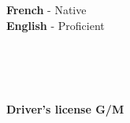 \documentclass[8pt]{developercv} %
\begin{document}

\begin{minipage}[t]{0.3\textwidth}
	\vspace{-\baselineskip} %

	
	\textbf{French} - Native\\
	\textbf{English} - Proficient\\
\end{minipage}
\hfill
\begin{minipage}[t]{0.3\textwidth}
	\vspace{-\baselineskip} %
	
	
	\\
	\\
	\\
\end{minipage}
\hfill
\begin{minipage}[t]{0.3\textwidth}
	\vspace{-\baselineskip} %
	
	
	\textbf{Driver's license G/M}\\
	
\end{minipage}

\end{document}

